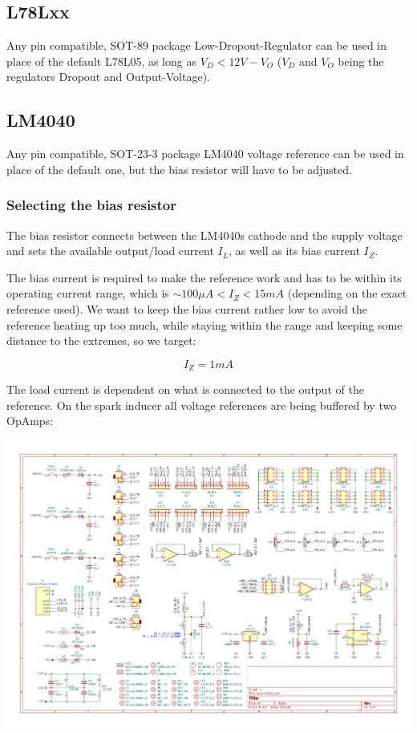\documentclass[12pt, a4paper]{article}
\begin{document}
\subsection*{L78Lxx}

Any pin compatible, SOT-89 package Low-Dropout-Regulator can be used in place of the
default L78L05, as long as \enspace $V_D < 12V - V_O$ \enspace ($V_D$ and $V_O$ being the
regulators Dropout and Output-Voltage).

\subsection*{LM4040}

Any pin compatible, SOT-23-3 package LM4040 voltage reference can be used in place of the
default one, but the bias resistor will have to be adjusted.

\subsubsection*{Selecting the bias resistor}
\label{ssec:appendix_lm4040_selecting_bias_resistor}

The bias resistor connects between the LM4040s cathode and the supply voltage and sets the
available output/load current $I_L$, as well as its bias current $I_Z$.

The bias current is required to make the reference work and has to be within its operating
current range, which is \enspace $\sim \!\! 100\mu A < I_Z < 15mA $ \enspace
(depending on the exact reference used). We want to keep the bias current rather low to avoid
the reference heating up too much, while staying within the range and keeping some distance to
the extremes, so we target:

\[ I_Z = 1mA \tag*{$(a)$}\label{tag:a} \]

The load current is dependent on what is connected to the output of the reference. On the
spark inducer all voltage references are being buffered by two OpAmps:

\includegraphics[width=\textwidth, trim = 16.7cm 8.9cm 1.5cm 9.1cm, clip=true]{pdf/schematic.pdf}
\end{document}
